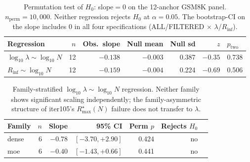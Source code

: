 \begin{table}[t]
\centering
\small
\caption{Permutation test of $H_0$: slope$=0$ on the 12-anchor GSM8K
panel.  $n_\mathrm{perm} = 10{,}000$.  Neither regression rejects
$H_0$ at $\alpha = 0.05$.  The bootstrap-CI on the slope includes
0 in all four specifications (ALL/FILTERED $\times$
$\lambda$/$R_\mathrm{inf}$).
\label{tab:iter109-perm}}
\begin{tabular}{lrrrrrl}
\toprule
Regression & $n$ & Obs.\ slope & Null mean & Null sd & $z$ & $p_{\mathrm{two}}$ \\
\midrule
$\log_{10}\lambda \sim \log_{10} N$ & 12 & $-0.138$ & $-0.003$ & 0.387 & $-0.35$ & 0.738 \\
$R_\mathrm{inf} \sim \log_{10} N$    & 12 & $-0.159$ & $-0.004$ & 0.224 & $-0.69$ & 0.506 \\
\bottomrule
\end{tabular}
\end{table}

\begin{table}[t]
\centering
\small
\caption{Family-stratified $\log_{10}\lambda \sim \log_{10} N$
regression.  Neither family shows significant scaling independently;
the family-asymmetric structure of iter105's $R_\mathrm{max}^\star(N)$
failure does not transfer to $\lambda$.
\label{tab:iter109-family}}
\begin{tabular}{lrrrrrl}
\toprule
Family & $n$ & Slope & 95\% CI & Perm $p$ & Rejects $H_0$ \\
\midrule
dense & 6 & $-0.78$ & $[-3.70, +2.90]$ & 0.424 & no \\
moe   & 6 & $-0.40$ & $[-1.43, +0.66]$ & 0.441 & no \\
\bottomrule
\end{tabular}
\end{table}


